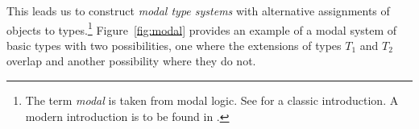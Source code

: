 

This leads us to construct \textit{modal type
systems} with alternative assignments of objects to
types.\footnote{The term \textit{modal} is taken from modal logic. See
  \cite{HughesCresswel1968} for a classic introduction. A modern
  introduction is to be found in \cite{BlackburnRijkeVenema2001}.}
Figure~\ref{fig:modal} provides an example of a modal system of basic
types with two
possibilities, one where the extensions of types $T_1$ and $T_2$
overlap and another possibility where they do not.  

